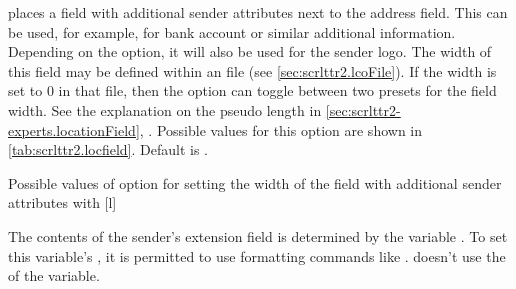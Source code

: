 \begin{Declaration}
\end{Declaration}
%
%
 places a field with additional sender attributes next to the
address field. This can be used, for example, for bank account
or similar additional information.
Depending on the
 option, it will also be used for the sender
logo. The width of this field may be defined within an  file
(see \autoref{sec:scrlttr2.lcoFile}). If the width is set to 0 in that file,
then the  option can toggle between two presets for
the field width. See the explanation on the  pseudo
length in \autoref{sec:scrlttr2-experts.locationField},
. Possible values for this
option are shown in \autoref{tab:scrlttr2.locfield}. Default is
.%
%
\begin{table}
  \setcapindent{0pt}%
  \begin{captionbeside}
    {Possible values of option  for
      setting the width of the field with additional sender attributes with
      \label{tab:scrlttr2.locfield}}%
    [l]
    \begin{minipage}[t]{.45\linewidth}
      \begin{desctabular}[t]
      \end{desctabular}
    \end{minipage}
  \end{captionbeside}
\end{table}

\begin{Declaration}
\end{Declaration}
%
The contents of the sender's extension field is determined by the
variable . To set this variable's , it is
permitted to use formatting commands like . \KOMAScript{}
doesn't use the  of the variable.

